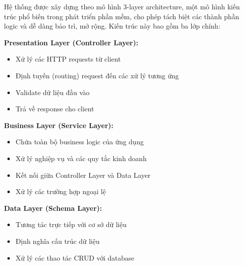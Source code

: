 \hspace{1cm}Hệ thống được xây dựng theo mô hình 3-layer architecture, một mô
hình kiến trúc phổ biến trong phát triển phần mềm, cho phép tách biệt các thành
phần logic và dễ dàng bảo trì, mở rộng. Kiến trúc này bao gồm ba lớp chính:

\begin{description}
    \item \textbf{Presentation Layer (Controller Layer):}
          \begin{itemize}
              \item Xử lý các HTTP requests từ client
              \item Định tuyến (routing) request đến các xử lý tương ứng
              \item Validate dữ liệu đầu vào
              \item Trả về response cho client
          \end{itemize}

    \item \textbf{Business Layer (Service Layer):}
          \begin{itemize}
              \item Chứa toàn bộ business logic của ứng dụng
              \item Xử lý nghiệp vụ và các quy tắc kinh doanh
              \item Kết nối giữa Controller Layer và Data Layer
              \item Xử lý các trường hợp ngoại lệ
          \end{itemize}

    \item \textbf{Data Layer (Schema Layer):}
          \begin{itemize}
              \item Tương tác trực tiếp với cơ sở dữ liệu
              \item Định nghĩa cấu trúc dữ liệu
              \item Xử lý các thao tác CRUD với database
          \end{itemize}
\end{description}

